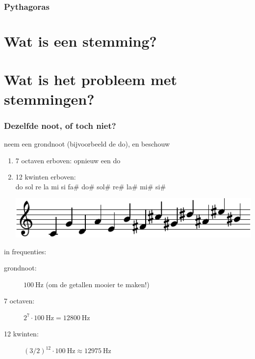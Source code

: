 \documentclass[compress, darktitle, framenumber, totalframenumber]{beamer}
\begin{document}
\begin{frame}
  \frametitle{Pythagoras}

\end{frame}

\section{Wat is een stemming?}

\section{Wat is het probleem met stemmingen?}

\begin{frame}
  \frametitle{Dezelfde noot, of toch niet?}

  neem een grondnoot (bijvoorbeeld de do), en beschouw
  \begin{enumerate}
    \item 7 octaven erboven: opnieuw een do
      \pause
    \item 12 kwinten erboven: \\
      do sol re la mi si fa\# do\# sol\# re\# la\# mi\# si\#

      \includegraphics{scores/circle-cropped}
  \end{enumerate}
  \pause
  in frequenties:
  \begin{description}
    \item[grondnoot:] $\SI{100}{\hertz}$ (om de getallen mooier te maken!)
    \item[7 octaven:] $2^7\cdot\SI{100}{\hertz}=\SI{12800}{\hertz}$ 
      \pause
    \item[12 kwinten:] $(3/2)^{12}\cdot\SI{100}{\hertz}\approx\SI{12975}{\hertz}$
  \end{description}
\end{frame}
\end{document}
